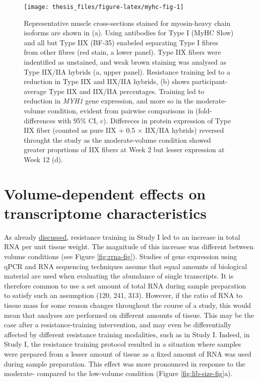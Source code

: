 \documentclass[twoside,10pt]{gihclass} %
\begin{document}
\pagebreak
\begin{figure}

{\centering \texttt{[image: thesis\_files/figure-latex/myhc-fig-1]} 

}

\caption[Fiber-type composition in Study I]{Representative muscle cross-sections stained for myosin-heavy chain isoforms are shown in (a). Using antibodies for Type I (MyHC Slow) and all but Type IIX (BF-35) enabeled separating Type I fibres from other fibres (red stain, a lower panel). Type IIX fibers were indentified as unstained, and weak brown staining was analysed as Type IIX/IIA hybrids (a, upper panel). Resistance training led to a reduction in Type IIX and IIX/IIA hybrids, (b) shows participant-average Type IIX and IIX/IIA percentages. Training led to reduction in \textit{MYH1} gene expression, and more so in the moderate-volume condition, evident from pairwise comparisons in (fold-differences with 95\% CI, c). Differeces in protein expression of Type IIX fiber (counted as pure IIX + 0.5 $\times$ IIX/IIA hybrids) reversed throught the study as the moderate-volume condition showed greater proprtions of IIX fibers at Week 2 but lesser expression at Week 12 (d).}\label{fig:myhc-fig}
\end{figure}
\pagebreak

\hypertarget{volume-dependent-effects-on-transcriptome-characteristics}{%
\section{Volume-dependent effects on transcriptome characteristics}\label{volume-dependent-effects-on-transcriptome-characteristics}}

As already \protect\hyperlink{muscle-mass-growth}{discussed}, resistance training in Study I led to an increase in total RNA per unit tissue weight. The magnitude of this increase was different between volume conditions (see Figure \ref{fig:rrna-fig}).
Studies of gene expression using qPCR and RNA sequencing techniques assume that equal amounts of biological material are used when evaluating the abundance of single transcripts.
It is therefore common to use a set amount of total RNA during sample preparation to satisfy such an assumption
(120, 241, 313).
However, if the ratio of RNA to tissue mass for some reason changes throughout the course of a study, this would mean that analyses are performed on different amounts of tissue. This may be the case after a resistance-training intervention, and may even be differentially affected by different resistance training modalities, such as in Study I.
Indeed, in Study I, the resistance training protocol resulted in a situation where samples were prepared from a lesser amount of tissue as a fixed amount of RNA was used during sample preparation.
This effect was more pronounced in response to the moderate- compared to the low-volume condition (Figure \ref{fig:lib-size-fig}a).
\end{document}
